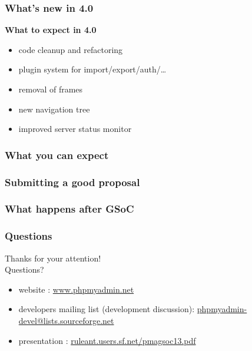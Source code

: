 \documentclass[14pt]{beamer}
\begin{document}
  \begin{frame}
    \frametitle{What's new in 4.0}
    \textbf{{\color{PmaOlive}What to expect in 4.0}}
    \begin{itemize}
      \item code cleanup and refactoring
      \item plugin system for import/export/auth/\ldots
      \item removal of frames
      \item new navigation tree
      \item improved server status monitor
    \end{itemize}
  \end{frame}
  \begin{frame}
    \frametitle{What you can expect}
  \end{frame}
  \begin{frame}
    \frametitle{Submitting a good proposal}
  \end{frame}
  \begin{frame}
    \frametitle{What happens after GSoC}
  \end{frame}
  \begin{frame}
   \frametitle{Questions}
    Thanks for your attention!\\
    Questions?
    \begin{itemize}
      \item website : \href{http://www.phpmyadmin.net/}{www.phpmyadmin.net}
      \item developers mailing list (development discussion): \href{mailto:phpmyadmin-devel@lists.sourceforge.net}{phpmyadmin-devel@lists.sourceforge.net}
      \item presentation : \href{http://ruleant.users.sf.net/pmagsoc13.pdf}{ruleant.users.sf.net/pmagsoc13.pdf}
    \end{itemize}
  \end{frame}
\end{document}
